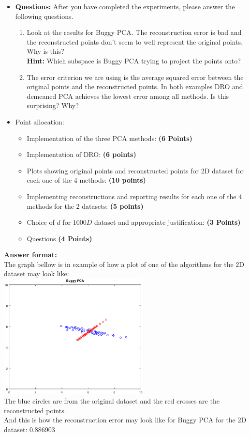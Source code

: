 \documentclass[a4paper]{article}
\newcounter{thm}
\theoremstyle{definition}
\begin{document}
\begin{itemize}
\item \textbf{Questions:} After you have completed the experiments, please answer the following questions.
\begin{enumerate}
\item Look at the results for Buggy PCA. The reconstruction error is bad and the
reconstructed points don't seem to well represent the original points. Why is
this? \\
\textbf{Hint: } Which subspace is Buggy PCA trying to project the points
onto?
\item The error criterion we are using is the average squared error 
between the original points and the reconstructed points.
In both examples DRO and demeaned PCA achieves the lowest error among all
methods. 
Is this surprising? Why?
\end{enumerate}

\item Point allocation:
\begin{itemize}
\item Implementation of the three PCA methods: \textbf{(6 Points)}
\item Implementation of DRO: \textbf{(6 points)}
\item Plots showing original points and reconstructed points for 2D dataset for each one of the 4 methods: \textbf{(10 points)}
\item Implementing reconstructions and reporting results for each one of the 4 methods for the 2 datasets: \textbf{(5 points)}
\item Choice of $d$ for $1000D$ dataset and appropriate justification:
\textbf{(3 Points)}
\item Questions \textbf{(4 Points)}
\end{itemize}

\end{itemize}



\vspace{0.2in}

\textbf{Answer format:}  \\
The graph bellow is in example of how a plot of one of the algorithms for the 2D dataset may look like: \\
\includegraphics[width=3in]{buggy_pca} \hspace{0.4in}
\\

The blue circles are from the original dataset and the red crosses are the reconstructed points. \\

And this is how the reconstruction error may look like for Buggy PCA for the 2D dataset: 0.886903








\end{document}
